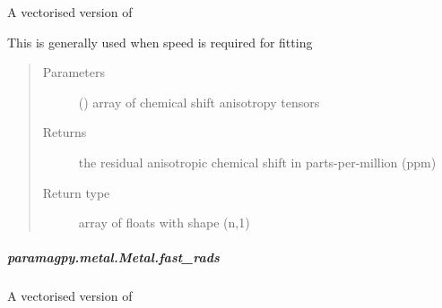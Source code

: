 \documentclass[a4paper,10pt,english]{sphinxmanual}
\begin{document}
\begin{fulllineitems}
\begin{fulllineitems}
\begin{fulllineitems}
\label{\detokenize{reference/generated/paramagpy.metal.Metal.fast_racs:paramagpy.metal.Metal.fast_racs}}
A vectorised version of {\hyperref[\detokenize{reference/generated/paramagpy.metal.Metal.racs:paramagpy.metal.Metal.racs}]{}}

This is generally used when speed is required for fitting
\begin{quote}\begin{description}
\item[{Parameters}] \leavevmode
{} (\sphinxstyleliteralemphasis{\sphinxupquote{ (}}\sphinxstyleliteralemphasis{\sphinxupquote{,}}\sphinxstyleliteralemphasis{\sphinxupquote{,}}\sphinxstyleliteralemphasis{\sphinxupquote{)}}) \textendash{} array of chemical shift anisotropy tensors

\item[{Returns}] \leavevmode
{} \textendash{} the residual anisotropic chemical shift in parts-per-million (ppm)

\item[{Return type}] \leavevmode
array of floats with shape (n,1)

\end{description}\end{quote}

\end{fulllineitems}



\subparagraph{paramagpy.metal.Metal.fast\_rads}
\label{\detokenize{reference/generated/paramagpy.metal.Metal.fast_rads:paramagpy-metal-metal-fast-rads}}\label{\detokenize{reference/generated/paramagpy.metal.Metal.fast_rads::doc}}

\begin{fulllineitems}
\label{\detokenize{reference/generated/paramagpy.metal.Metal.fast_rads:paramagpy.metal.Metal.fast_rads}}
A vectorised version of {\hyperref[\detokenize{reference/generated/paramagpy.metal.Metal.rads:paramagpy.metal.Metal.rads}]{}}


\end{fulllineitems}
\end{fulllineitems}
\end{fulllineitems}
\end{document}
